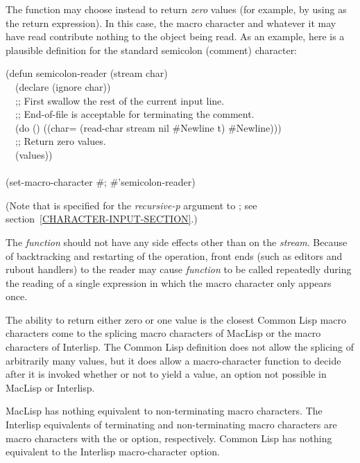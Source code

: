 \begin{defun}[Function]

The function may choose instead to return \emph{zero} values
(for example, by using  as the return expression).
In this case, the macro character and whatever it may have read
contribute nothing to the object being read.
As an example, here is a plausible definition for the standard semicolon
(comment) character:
\begin{lisp}
(defun semicolon-reader (stream char) \\
~~(declare (ignore char)) \\
~~;; First swallow the rest of the current input line. \\
~~;; End-of-file is acceptable for terminating the comment. \\
~~(do () ((char= (read-char stream nil \#{\Xbackslash}Newline t) \#{\Xbackslash}Newline))) \\
~~;; Return zero values. \\
~~(values)) \\
 \\
(set-macro-character \#{\Xbackslash}; \#'semicolon-reader)
\end{lisp}
(Note that {\true} is specified for the \emph{recursive-p} argument
to ; see section~\ref{CHARACTER-INPUT-SECTION}.)

The \emph{function} should not have any side effects other than on the
\emph{stream}.
Because of backtracking and restarting of the  operation,
front ends (such as editors and
rubout handlers) to the reader may cause
\emph{function} to be called repeatedly during the
reading of a single expression in which the macro character only appears
once.

\beforenoterule
\begin{incompatibility}
The ability to return either zero or one value
is the closest Common Lisp macro characters come to the splicing macro
characters of MacLisp or the  macro characters of Interlisp.
The Common Lisp definition does not allow the splicing of arbitrarily many
values, but it does allow a macro-character function to decide
after it is invoked whether or not to yield a value, an option not
possible in MacLisp or Interlisp.

MacLisp has nothing equivalent to non-terminating macro characters.
The Interlisp equivalents of terminating and non-terminating macro
characters are macro characters with the  or  option,
respectively.  Common Lisp has nothing equivalent to the Interlisp 
macro-character option.
\end{incompatibility}
\afternoterule


\end{defun}
